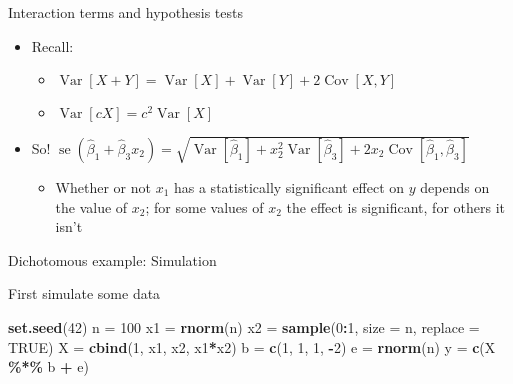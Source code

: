 \documentclass[
  ignorenonframetext,
]{beamer}
\newenvironment{Shaded}{\begin{snugshade}}{\end{snugshade}}
\newcommand{\AttributeTok}[1]{\textcolor[rgb]{0.13,0.29,0.53}{#1}}
\newcommand{\ConstantTok}[1]{\textcolor[rgb]{0.56,0.35,0.01}{#1}}
\newcommand{\DecValTok}[1]{\textcolor[rgb]{0.00,0.00,0.81}{#1}}
\newcommand{\FunctionTok}[1]{\textcolor[rgb]{0.13,0.29,0.53}{\textbf{#1}}}
\newcommand{\NormalTok}[1]{#1}
\newcommand{\OtherTok}[1]{\textcolor[rgb]{0.56,0.35,0.01}{#1}}
\newcommand{\SpecialCharTok}[1]{\textcolor[rgb]{0.81,0.36,0.00}{\textbf{#1}}}
\providecommand{\tightlist}{%
  \setlength{\itemsep}{0pt}\setlength{\parskip}{0pt}}
\newcommand{\setsep}{\setlength{\itemsep}{3pt}}
\newcommand{\setskip}{\setlength{\parskip}{3pt}}
\renewcommand{\tightlist}{\setsep\setskip}
\begin{document}
\begin{frame}{Interaction terms and hypothesis tests}
\label{interaction-terms-and-hypothesis-tests}
\pause

\begin{itemize}[<+->]
\tightlist
\item
  Recall:

  \begin{itemize}[<+->]
  \tightlist
  \item
    \(\ensuremath{\mathop{\mathrm{Var}}\left[X + Y\right]} = \ensuremath{\mathop{\mathrm{Var}}\left[X\right]} + \ensuremath{\mathop{\mathrm{Var}}\left[Y\right]} + 2\ensuremath{\mathop{\mathrm{Cov}}\left[X, Y\right]}\)
  \item
    \(\ensuremath{\mathop{\mathrm{Var}}\left[c X\right]} = c^2 \ensuremath{\mathop{\mathrm{Var}}\left[X\right]}\)
  \end{itemize}
\item
  So! \(\mathop{\mathrm{se}}\left(\hat{\beta}_1 + \hat{\beta}_3 x_2\right) = \sqrt{\ensuremath{\mathop{\mathrm{Var}}\left[\hat{\beta}_1\right]} + x_2^2 \ensuremath{\mathop{\mathrm{Var}}\left[\hat{\beta}_3\right]} + 2 x_2 \ensuremath{\mathop{\mathrm{Cov}}\left[\hat{\beta}_1, \hat{\beta}_3\right]}}\)

  \begin{itemize}[<+->]
  \tightlist
  \item
    Whether or not \(x_1\) has a statistically significant effect on \(y\) depends on the value of \(x_2\); for some values of \(x_2\) the effect is significant, for others it isn't
  \end{itemize}
\end{itemize}
\end{frame}

\begin{frame}[fragile]{Dichotomous example: Simulation}
\label{dichotomous-example-simulation}
\pause

First simulate some data

\begin{Shaded}
\begin{Highlighting}[]
\FunctionTok{set.seed}\NormalTok{(}\DecValTok{42}\NormalTok{)}
\NormalTok{n  }\OtherTok{=} \DecValTok{100}
\NormalTok{x1 }\OtherTok{=} \FunctionTok{rnorm}\NormalTok{(n)}
\NormalTok{x2 }\OtherTok{=} \FunctionTok{sample}\NormalTok{(}\DecValTok{0}\SpecialCharTok{:}\DecValTok{1}\NormalTok{, }\AttributeTok{size =}\NormalTok{ n, }\AttributeTok{replace =} \ConstantTok{TRUE}\NormalTok{)}
\NormalTok{X  }\OtherTok{=} \FunctionTok{cbind}\NormalTok{(}\DecValTok{1}\NormalTok{, x1, x2, x1}\SpecialCharTok{*}\NormalTok{x2)}
\NormalTok{b  }\OtherTok{=} \FunctionTok{c}\NormalTok{(}\DecValTok{1}\NormalTok{, }\DecValTok{1}\NormalTok{, }\DecValTok{1}\NormalTok{, }\SpecialCharTok{{-}}\DecValTok{2}\NormalTok{)}
\NormalTok{e  }\OtherTok{=} \FunctionTok{rnorm}\NormalTok{(n)}
\NormalTok{y  }\OtherTok{=} \FunctionTok{c}\NormalTok{(X }\SpecialCharTok{\%*\%}\NormalTok{ b }\SpecialCharTok{+}\NormalTok{ e)}
\end{Highlighting}
\end{Shaded}
\end{frame}
\end{document}
